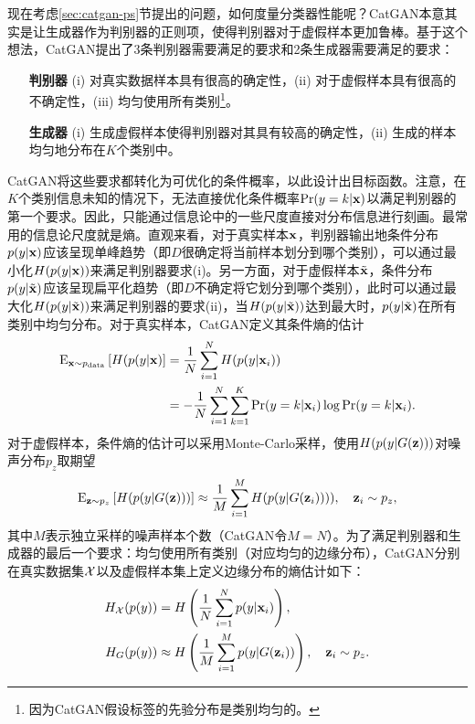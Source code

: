现在考虑\ref{sec:catgan-ps}节提出的问题，如何度量分类器性能呢？CatGAN本意其实是让生成器作为判别器的正则项，使得判别器对于虚假样本更加鲁棒。基于这个想法，CatGAN提出了3条判别器需要满足的要求和2条生成器需要满足的要求：
\begin{itemize}
  \item[\textbf{判别器}](i) 对真实数据样本具有很高的确定性，(ii) 对于虚假样本具有很高的不确定性，(iii) 均匀使用所有类别\footnote{因为CatGAN假设标签的先验分布是类别均匀的。}。
  \item[\textbf{生成器}](i) 生成虚假样本使得判别器对其具有较高的确定性，(ii) 生成的样本均匀地分布在$K$个类别中。
\end{itemize}

CatGAN将这些要求都转化为可优化的条件概率，以此设计出目标函数。注意，在$K$个类别信息未知的情况下，无法直接优化条件概率$\Pr(y=k|\mathbf{x})$以满足判别器的第一个要求。因此，只能通过信息论中的一些尺度直接对分布信息进行刻画。最常用的信息论尺度就是熵。直观来看，对于真实样本$\mathbf{x}$，判别器输出地条件分布$p(y|\mathbf{x})$应该呈现单峰趋势（即$D$很确定将当前样本划分到哪个类别），可以通过最小化$H(p(y|\mathbf{x}))$来满足判别器要求(i)。另一方面，对于虚假样本$\tilde{\mathbf{x}}$，条件分布$p(y|\tilde{\mathbf{x}})$应该呈现扁平化趋势（即$D$不确定将它划分到哪个类别），此时可以通过最大化$H(p(y|\tilde{\mathbf{x}}))$来满足判别器的要求(ii)，当$H(p(y|\tilde{\mathbf{x}}))$达到最大时，$p(y|\tilde{\mathbf{x}})$在所有类别中均匀分布。对于真实样本，CatGAN定义其条件熵的估计
\begin{equation}
  \begin{split}
    \text{E}_{ \mathbf{x} \sim p_{\text{data}} } \left[ H(p(y|\mathbf{x}) \right]
      &= \frac{1}{N} \sum_{i=1}^N H(p(y|\mathbf{x}_i)) \\
      &= -\frac{1}{N} \sum_{i=1}^N \sum_{k=1}^K \Pr(y=k|\mathbf{x}_i) \log\Pr(y=k|\mathbf{x}_i).
  \end{split}
  \label{eq:hy_given_x_real}
\end{equation}
对于虚假样本，条件熵的估计可以采用Monte-Carlo采样，使用$H(p(y|G(\mathbf{z})))$对噪声分布$p_z$取期望
\begin{equation}
  \text{E}_{ \mathbf{z} \sim p_z } \left[ H(p(y|G(\mathbf{z}))) \right]
  \approx \frac{1}{M} \sum_{i=1}^M H(p(y|G(\mathbf{z}_i)))), \quad \mathbf{z}_i \sim p_z,
  \label{eq:hy_give_x_fake}
\end{equation}
其中$M$表示独立采样的噪声样本个数（CatGAN令$M=N$）。为了满足判别器和生成器的最后一个要求：均匀使用所有类别（对应均匀的边缘分布），CatGAN分别在真实数据集$\mathcal{X}$以及虚假样本集上定义边缘分布的熵估计如下：
\begin{equation}
  \begin{split}
    H_{\mathcal{X}}(p(y)) &= H\left( \frac{1}{N} \sum_{i=1}^N p(y|\mathbf{x}_i) \right), \\
    H_{G}(p(y)) &\approx H\left( \frac{1}{M} \sum_{i=1}^M p(y|G(\mathbf{z}_i)) \right), \quad \mathbf{z}_i \sim p_z.
  \end{split}
  \label{eq:hy}
\end{equation}
